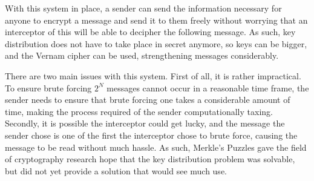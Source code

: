 \documentclass[a4paper,12pt]{report}
\begin{document}
With this system in place, a sender can send the information necessary for
anyone to encrypt a message and send it to them freely without worrying that an
interceptor of this will be able to decipher the following message. As such, key
distribution does not have to take place in secret anymore, so keys can be
bigger, and the Vernam cipher can be used, strengthening messages considerably.

There are two main issues with this system. First of all, it is rather
impractical. To ensure brute forcing \(2^N\) messages cannot occur in a
reasonable time frame, the sender needs to ensure that brute forcing one takes a
considerable amount of time, making the process required of the sender
computationally taxing. Secondly, it is possible the interceptor could get
lucky, and the message the sender chose is one of the first the interceptor
chose to brute force, causing the message to be read without much hassle. As
such, Merkle's Puzzles gave the field of cryptography research hope that the key
distribution problem was solvable, but did not yet provide a solution that would
see much use.
\end{document}
